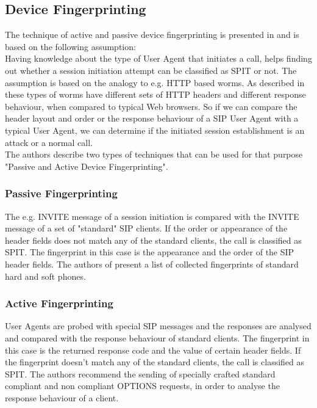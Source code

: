 \documentclass[final
	]{issa}
\begin{document}
\subsection{Device Fingerprinting}
The technique of active and passive device fingerprinting is presented in \cite{paper:fingerprint} and is based on the following assumption:\\
Having knowledge about the type of User Agent that initiates a call, helps finding out whether a session initiation attempt can be classified as SPIT or not. The assumption is based on the analogy to e.g. HTTP based worms. As described in \cite{paper:fingerprint} these types of worms have different sets of HTTP headers and different response behaviour, when compared to typical Web browsers. So if we can compare the header layout and order or the response behaviour of a SIP User Agent with a typical User Agent, we can determine if the initiated session establishment is an attack or a normal call.\\
The authors describe two types of techniques that can be used for that purpose "Passive and Active Device Fingerprinting".
\subsubsection{Passive Fingerprinting}
The e.g. INVITE message of a session initiation is compared with the INVITE message of a set of "standard" SIP clients. If the order or appearance of the header fields does not match any of the standard clients, the call is classified as SPIT. The fingerprint in this case is the appearance and the order of the SIP header fields. The authors of \cite{paper:fingerprint} present a list of collected fingerprints of standard hard and soft phones.
\subsubsection{Active Fingerprinting}
User Agents are probed with special SIP messages and the responses are analysed and compared with the response behaviour of standard clients. The fingerprint in this case is the returned response code and the value of certain header fields. If the fingerprint doesn't match any of the standard clients, the call is classified as SPIT. The authors recommend the sending of specially crafted standard compliant and non compliant OPTIONS requests, in order to analyse the response behaviour of a client.
\end{document}
